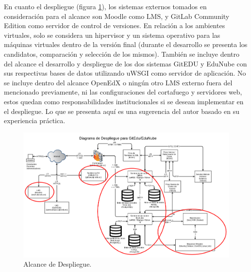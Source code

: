 En cuanto el despliegue (figura \ref{alc_desp_ge_en}), los sistemas externos tomados en consideración para el alcance son Moodle como LMS, y GitLab Community Edition como servidor de control de versiones. En relación a los ambientes virtuales, solo se considera un hipervisor y un sistema operativo para las máquinas virtuales dentro de la versión final (durante el desarrollo se presenta los candidatos, comparación y selección de los mismos). También se incluye dentro del alcance el desarrollo y despliegue de los dos sistemas GitEDU y EduNube con sus respectivas bases de datos utilizando uWSGI como servidor de aplicación. No se incluye dentro del alcance OpenEdX o ningún otro LMS  externo fuera del mencionado previamente, ni las configuraciones del cortafuego y servidores web, estos quedan como responsabilidades institucionales si se desean implementar en el despliegue. Lo que se presenta aquí es una sugerencia del autor basado en su experiencia práctica.

\begin{landscape}

	\begin{figure}
	  \begin{center}
	    \includegraphics[width=1.4\textwidth]{Figures/alc_desp_ge_en.png}
	  \end{center}
	  \caption{Alcance de Despliegue.}
	  \label{alc_desp_ge_en}
	\end{figure}

\end{landscape}
